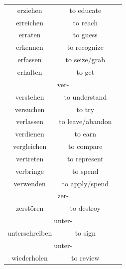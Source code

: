 \begin{center}
\begin{longtable} {|c|c|c|}
        erziehen       & to educate       &                      \\
        erreichen      & to reach         &                      \\
        erraten        & to guess         &                      \\
        erkennen       & to recognize     &                      \\
        erfassen       & to seize/grab    &                      \\
        erhalten       & to get           &                      \\
        \hline
        \multicolumn{3}{|c|}{ver-}                               \\
        \hline
        verstehen      & to understand    &                      \\
        versuchen      & to try           &                      \\
        verlassen      & to leave/abandon &                      \\
        verdienen      & to earn          &                      \\
        vergleichen    & to compare       &                      \\
        vertreten      & to represent     &                      \\
        verbringe      & to spend         &                      \\
        verwenden      & to apply/spend   &                      \\
        \hline
        \multicolumn{3}{|c|}{zer-}                               \\
        \hline
        zerstören      & to destroy       &                      \\
        \hline
        \multicolumn{3}{|c|}{unter-}                             \\
        \hline
        unterschreiben & to sign          &                      \\
        \hline
        \multicolumn{3}{|c|}{unter-}                             \\
        \hline
        wiederholen    & to review        &                      \\
        \hline
    \end{longtable}
\end{center}

